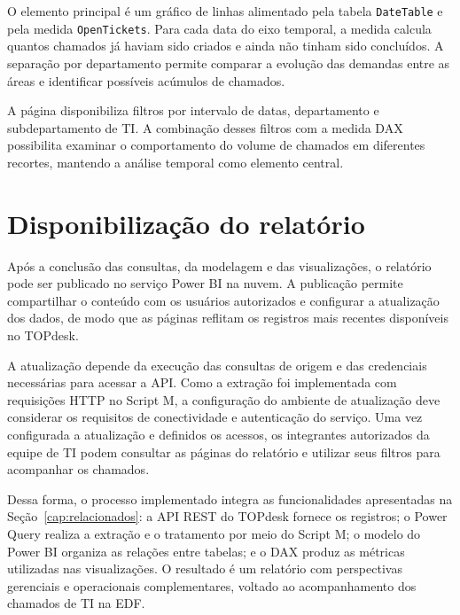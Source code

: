 O elemento principal é um gráfico de linhas alimentado pela tabela \texttt{DateTable} e pela medida \texttt{OpenTickets}. Para cada data do eixo temporal, a medida calcula quantos chamados já haviam sido criados e ainda não tinham sido concluídos. A separação por departamento permite comparar a evolução das demandas entre as áreas e identificar possíveis acúmulos de chamados.

A página disponibiliza filtros por intervalo de datas, departamento e subdepartamento de TI. A combinação desses filtros com a medida DAX possibilita examinar o comportamento do volume de chamados em diferentes recortes, mantendo a análise temporal como elemento central.


\section{Disponibilização do relatório}

Após a conclusão das consultas, da modelagem e das visualizações, o relatório pode ser publicado no serviço Power BI na nuvem. A publicação permite compartilhar o conteúdo com os usuários autorizados e configurar a atualização dos dados, de modo que as páginas reflitam os registros mais recentes disponíveis no TOPdesk.

A atualização depende da execução das consultas de origem e das credenciais necessárias para acessar a API. Como a extração foi implementada com requisições HTTP no Script M, a configuração do ambiente de atualização deve considerar os requisitos de conectividade e autenticação do serviço. Uma vez configurada a atualização e definidos os acessos, os integrantes autorizados da equipe de TI podem consultar as páginas do relatório e utilizar seus filtros para acompanhar os chamados.

Dessa forma, o processo implementado integra as funcionalidades apresentadas na Seção~\ref{cap:relacionados}: a API REST do TOPdesk fornece os registros; o Power Query realiza a extração e o tratamento por meio do Script M; o modelo do Power BI organiza as relações entre tabelas; e o DAX produz as métricas utilizadas nas visualizações. O resultado é um relatório com perspectivas gerenciais e operacionais complementares, voltado ao acompanhamento dos chamados de TI na EDF.
